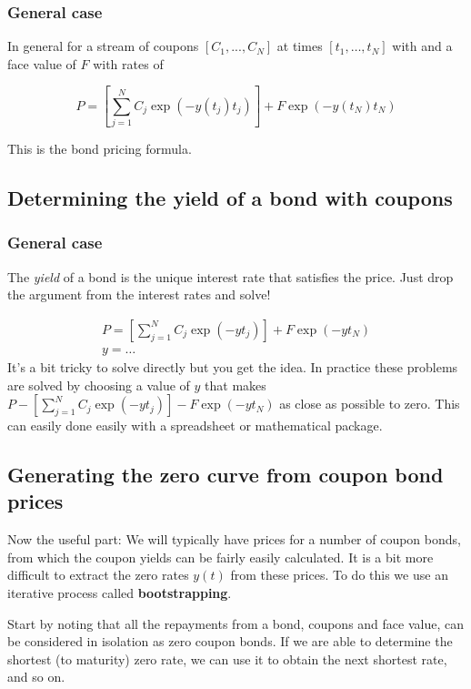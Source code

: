 \subsubsection{General case}
In general for a stream of coupons $[C_1,...,C_N]$ at times $[t_1,\ldots,t_N]$ with and a face value of $F$ with rates of

\begin{equation}P = \left[\sum_{j=1}^N C_j\exp(-y(t_j)t_j)\right] + F \exp(-y(t_N)t_N)  \label{bondPrice}\end{equation}

This is the bond pricing formula.

\subsection{Determining the yield of a bond with coupons}

\subsubsection{General case}
The \textit{yield} of a bond is the unique interest rate that satisfies the price. Just drop the argument from the interest rates and solve!

\begin{eqnarray*}
P = \left[\sum_{j=1}^N C_j\exp(-yt_j)\right] + F \exp(-yt_N) \\
y = \ldots
\end{eqnarray*}
It's a bit tricky to solve directly but you get the idea. In practice these problems are solved by choosing a value of $y$ that makes $P- \left[\sum_{j=1}^N C_j\exp(-yt_j)\right] - F \exp(-yt_N)$ as close as possible to zero. This can easily done easily with a spreadsheet or mathematical package.

\subsection{Generating the zero curve from coupon bond prices}

Now the useful part: We will typically have prices for a number of coupon bonds, from which the coupon yields can be fairly easily calculated. It is a bit more difficult to extract the zero rates $y(t)$ from these prices. To do this we use an iterative process called \textbf{bootstrapping}.

Start by noting that all the repayments from a bond, coupons and face value, can be considered in isolation as zero coupon bonds. If we are able to determine the shortest (to maturity) zero rate, we can use it to obtain the next shortest rate, and so on.

